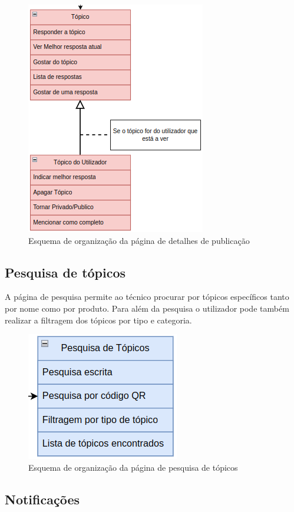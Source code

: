 \begin{figure}[htb]
    \centering
    
    \includegraphics[height=0.55\textwidth]{images/Arquiteturas/superficial_de_app/detalhes_topico.png}
    \caption{Esquema de organização da página de detalhes de publicação}
    \label{fig:7}
\end{figure}

\subsection{Pesquisa de tópicos}

A página de pesquisa permite ao técnico procurar por tópicos específicos tanto por nome como por produto. Para além da pesquisa o utilizador pode também realizar a filtragem dos 
tópicos por tipo e categoria.
\begin{figure}[htb]
    \centering
    
    \includegraphics[height=0.3\textwidth]{images/Arquiteturas/superficial_de_app/pesquisa_forum.png}
    \caption{Esquema de organização da página de pesquisa de tópicos}
    \label{fig:8}
\end{figure}

\subsection{Notificações}

